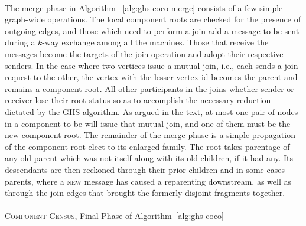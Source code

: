 \documentclass[11pt,epsf]{article}
\begin{document}
{{    \paragraph{}{
      The merge phase in Algorithm ~\ref{alg:ghs-coco-merge} consists of a few simple graph-wide operations. The local component
      roots are checked for the presence of outgoing edges, and those which need to perform a join add a message to be sent
      during a $k$-way exchange among all the machines. Those that receive the messages become the targets of the join operation
      and adopt their respective senders. In the case where two vertices issue a mutual join, i.e., each sends a join request
      to the other, the vertex with the lesser vertex id becomes the parent and remains a component root. All other
      participants in the joins whether sender or receiver lose their root status so as to accomplish the necessary
      reduction dictated by the GHS algorithm. As argued in the text, at most one pair of nodes in a component-to-be
      will issue that mutual join\autocite[105]{DNA}, and one of them must be the new component root. The remainder
      of the merge phase is a simple propagation of the component root elect to its enlarged family. The root
      takes parentage of any old parent which was not itself along with its old children, if it had any. Its
      descendants are then reckoned through their prior children and in some cases parents, where a \textsc{new} message
      has caused a reparenting downstream, as well as through the join edges that brought the formerly disjoint fragments together.
    }

    \paragraph{}{
      \begin{algorithm}
        \footnotesize
        \caption{\textsc{Component-Census}, Final Phase of Algorithm~\ref{alg:ghs-coco} }
        \label{alg:component-census}
        \begin{algorithmic}
          \ENDFOR

\end{algorithmic}
\end{algorithm}}}}
\end{document}
